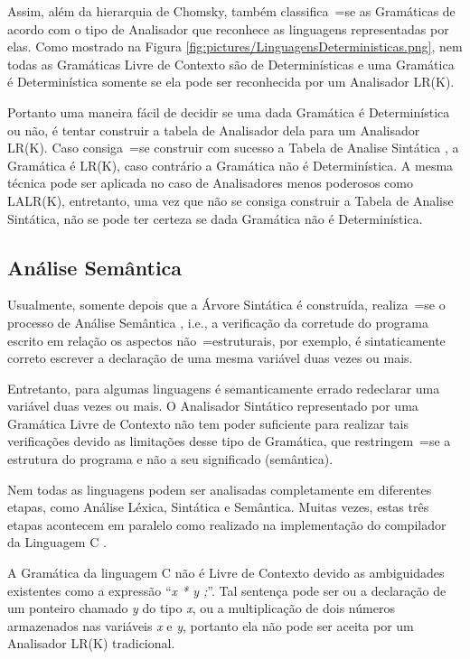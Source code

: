 {    Assim,
    além da hierarquia de Chomsky,
    também classifica~=se as Gramáticas de acordo com o tipo de Analisador que reconhece as linguagens representadas por elas.
    Como mostrado na Figura \ref{fig:pictures/LinguagensDeterministicas.png},
    nem todas as Gramáticas Livre de Contexto são de Determinísticas e
    uma Gramática é Determinística somente se ela pode ser reconhecida por um Analisador LR(K).

    Portanto uma maneira fácil de decidir se uma dada Gramática é Determinística ou
    não,
    é tentar construir a tabela de Analisador dela para um Analisador LR(K).
    Caso consiga~=se construir com sucesso a Tabela de Analise Sintática \cite{ahoCompilerDragonBook},
    a Gramática é LR(K),
    caso contrário a Gramática não é Determinística.
    A mesma técnica pode ser aplicada no caso de Analisadores menos poderosos como LALR(K),
    entretanto,
    uma vez que não se consiga construir a Tabela de Analise Sintática,
    não se pode ter certeza se dada Gramática não é Determinística.


\subsection{Análise Semântica}

    Usualmente,
    somente depois que a Árvore Sintática é construída,
    realiza~=se o processo de Análise Semântica \cite{ahoCompilerDragonBook},
    i.e.,
    a verificação da corretude do programa escrito em relação os aspectos não~=estruturais,
    por exemplo,
    é sintaticamente correto escrever a declaração de uma mesma variável duas vezes ou
    mais.

    Entretanto,
    para algumas linguagens é semanticamente errado redeclarar uma variável duas vezes ou
    mais.
    O Analisador Sintático representado por uma Gramática Livre de Contexto não tem poder suficiente para realizar tais verificações devido as limitações desse tipo de Gramática,
    que restringem~=se a estrutura do programa e
    não a seu significado (semântica).

    Nem todas as linguagens podem ser analisadas completamente em diferentes etapas,
    como Análise Léxica, Sintática e Semântica. Muitas vezes,
    estas três etapas acontecem em paralelo como realizado na implementação do compilador da Linguagem C \cite{jourdan2017,whyCcannotBeParsedWithALR1Parser}.

    A Gramática da linguagem C não é Livre de Contexto devido as ambiguidades existentes como a expressão ``\textit{x * y ;}''.
    Tal sentença pode ser ou
    a declaração de um ponteiro chamado \textit{y} do tipo \textit{x},
    ou a multiplicação de dois números armazenados nas variáveis \textit{x} e
    \textit{y},
    portanto ela não pode ser aceita por um Analisador LR(K) tradicional.

}
